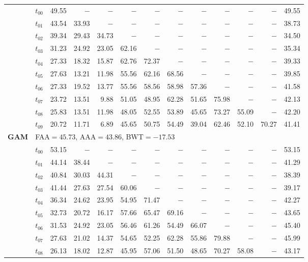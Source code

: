 \begin{table}[ht]
\begin{tabular}{@{}l l r r r r r r r r r r r@{}}
 & $t_{00}$ & 49.55 & $-$ & $-$ & $-$ & $-$ & $-$ & $-$ & $-$ & $-$ & $-$ & 49.55 \\
 & $t_{01}$ & 43.54 & 33.93 & $-$ & $-$ & $-$ & $-$ & $-$ & $-$ & $-$ & $-$ & 38.73 \\
 & $t_{02}$ & 39.34 & 29.43 & 34.73 & $-$ & $-$ & $-$ & $-$ & $-$ & $-$ & $-$ & 34.50 \\
 & $t_{03}$ & 31.23 & 24.92 & 23.05 & 62.16 & $-$ & $-$ & $-$ & $-$ & $-$ & $-$ & 35.34 \\
 & $t_{04}$ & 27.33 & 18.32 & 15.87 & 62.76 & 72.37 & $-$ & $-$ & $-$ & $-$ & $-$ & 39.33 \\
 & $t_{05}$ & 27.63 & 13.21 & 11.98 & 55.56 & 62.16 & 68.56 & $-$ & $-$ & $-$ & $-$ & 39.85 \\
 & $t_{06}$ & 27.33 & 19.52 & 13.77 & 55.56 & 58.56 & 58.98 & 57.36 & $-$ & $-$ & $-$ & 41.58 \\
 & $t_{07}$ & 23.72 & 13.51 & 9.88 & 51.05 & 48.95 & 62.28 & 51.65 & 75.98 & $-$ & $-$ & 42.13 \\
 & $t_{08}$ & 25.83 & 13.51 & 11.98 & 48.05 & 52.55 & 53.89 & 45.65 & 73.27 & 55.09 & $-$ & 42.20 \\
 & $t_{09}$ & 20.72 & 11.71 & 6.89 & 45.65 & 50.75 & 54.49 & 39.04 & 62.46 & 52.10 & 70.27 & 41.41 \\
\midrule
\multirow{11}{*}{\textbf{GAM}} & \multicolumn{12}{l}{\quad\small FAA$=45.73$,\; AAA$=43.86$,\; BWT$=-17.53$} \\
 & $t_{00}$ & 53.15 & $-$ & $-$ & $-$ & $-$ & $-$ & $-$ & $-$ & $-$ & $-$ & 53.15 \\
 & $t_{01}$ & 44.14 & 38.44 & $-$ & $-$ & $-$ & $-$ & $-$ & $-$ & $-$ & $-$ & 41.29 \\
 & $t_{02}$ & 40.84 & 30.03 & 44.31 & $-$ & $-$ & $-$ & $-$ & $-$ & $-$ & $-$ & 38.39 \\
 & $t_{03}$ & 41.44 & 27.63 & 27.54 & 60.06 & $-$ & $-$ & $-$ & $-$ & $-$ & $-$ & 39.17 \\
 & $t_{04}$ & 36.34 & 24.62 & 23.95 & 54.95 & 71.47 & $-$ & $-$ & $-$ & $-$ & $-$ & 42.27 \\
 & $t_{05}$ & 32.73 & 20.72 & 16.17 & 57.66 & 65.47 & 69.16 & $-$ & $-$ & $-$ & $-$ & 43.65 \\
 & $t_{06}$ & 31.53 & 24.92 & 23.05 & 56.46 & 61.26 & 54.49 & 66.07 & $-$ & $-$ & $-$ & 45.40 \\
 & $t_{07}$ & 27.63 & 21.02 & 14.37 & 54.65 & 52.25 & 62.28 & 55.86 & 79.88 & $-$ & $-$ & 45.99 \\
 & $t_{08}$ & 26.13 & 18.02 & 12.87 & 45.95 & 57.06 & 51.50 & 48.65 & 70.27 & 58.08 & $-$ & 43.17 \\

\end{tabular}
\end{table}
